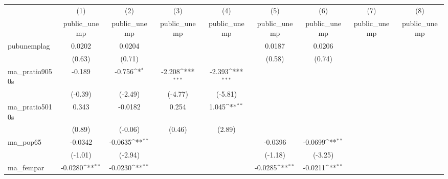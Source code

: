 {
\def\sym#1{\ifmmode^{#1}\else\(^{#1}\)\fi}
\begin{tabular}{l*{8}{c}}
\hline\hline
            &\multicolumn{1}{c}{(1)}&\multicolumn{1}{c}{(2)}&\multicolumn{1}{c}{(3)}&\multicolumn{1}{c}{(4)}&\multicolumn{1}{c}{(5)}&\multicolumn{1}{c}{(6)}&\multicolumn{1}{c}{(7)}&\multicolumn{1}{c}{(8)}\\
            &\multicolumn{1}{c}{public\_unemp}&\multicolumn{1}{c}{public\_unemp}&\multicolumn{1}{c}{public\_unemp}&\multicolumn{1}{c}{public\_unemp}&\multicolumn{1}{c}{public\_unemp}&\multicolumn{1}{c}{public\_unemp}&\multicolumn{1}{c}{public\_unemp}&\multicolumn{1}{c}{public\_unemp}\\
\hline
pubunemplag &      0.0202         &      0.0204         &                     &                     &      0.0187         &      0.0206         &                     &                     \\
            &      (0.63)         &      (0.71)         &                     &                     &      (0.58)         &      (0.74)         &                     &                     \\
[1em]
ma\_pratio9050s&      -0.189         &      -0.756\sym{*}  &      -2.208\sym{***}&      -2.393\sym{***}&                     &                     &                     &                     \\
            &     (-0.39)         &     (-2.49)         &     (-4.77)         &     (-5.81)         &                     &                     &                     &                     \\
[1em]
ma\_pratio5010s&       0.343         &     -0.0182         &       0.254         &       1.045\sym{**} &                     &                     &                     &                     \\
            &      (0.89)         &     (-0.06)         &      (0.46)         &      (2.89)         &                     &                     &                     &                     \\
[1em]
ma\_pop65    &     -0.0342         &     -0.0635\sym{**} &                     &                     &     -0.0396         &     -0.0699\sym{**} &                     &                     \\
            &     (-1.01)         &     (-2.94)         &                     &                     &     (-1.18)         &     (-3.25)         &                     &                     \\
[1em]
ma\_fempar   &     -0.0280\sym{**} &     -0.0230\sym{**} &                     &                     &     -0.0285\sym{**} &     -0.0211\sym{**} &                     &                     \\

\end{tabular}}
